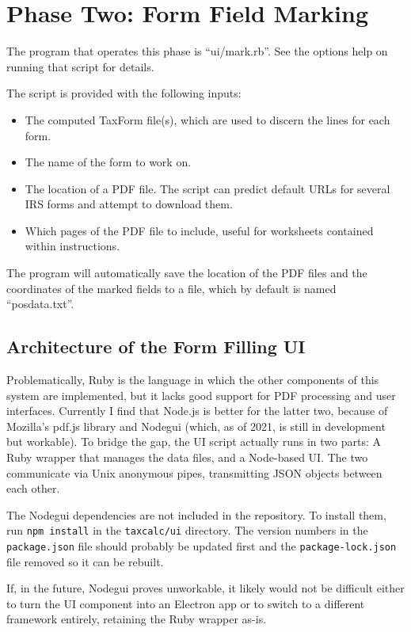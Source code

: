 \section{Phase Two: Form Field Marking}

The program that operates this phase is ``ui/mark.rb''. See the options help on
running that script for details.

The script is provided with the following inputs:
\begin{itemize}
\item The computed TaxForm file(s), which are used to discern the lines for each
form.
\item The name of the form to work on.
\item The location of a PDF file. The script can predict default URLs for
several IRS forms and attempt to download them.
\item Which pages of the PDF file to include, useful for worksheets contained
within instructions.
\end{itemize}
The program will automatically save the location of the PDF files and the
coordinates of the marked fields to a file, which by default is named
``\hbox{posdata.txt}''.


\subsection{Architecture of the Form Filling UI}

Problematically, Ruby is the language in which the other components of this
system are implemented, but it lacks good support for PDF processing and user
interfaces. Currently I find that Node.js is better for the latter two, because
of Mozilla's pdf.js library and Nodegui (which, as of 2021, is still in
development but workable). To bridge the gap, the UI script actually runs in two
parts: A Ruby wrapper that manages the data files, and a Node-based UI. The two
communicate via Unix anonymous pipes, transmitting JSON objects between each
other.

The Nodegui dependencies are not included in the repository. To install them,
run \texttt{npm install} in the \texttt{taxcalc/ui} directory. The version
numbers in the \texttt{package.json} file should probably be updated first and
the \texttt{package-lock.json} file removed so it can be rebuilt.

If, in the future, Nodegui proves unworkable, it likely would not be difficult
either to turn the UI component into an Electron app or to switch to a different
framework entirely, retaining the Ruby wrapper as-is.


